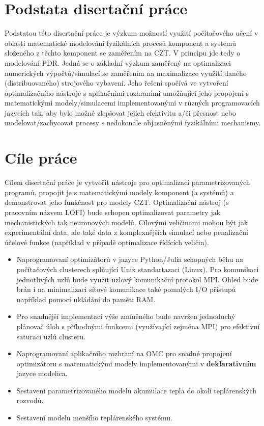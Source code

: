 \section{Podstata disertační práce}
\label{sec:Podstata}
Podstatou této disertační práce je výzkum možností využití počítačového učení
v oblasti matematické modelování fyzikálních procesů komponent a systémů
složeného z těchto komponent se zaměřením na CZT. V principu jde tedy o
modelování PDR. Jedná se o základní výzkum zaměřený na optimalizaci
numerických výpočtů/simulací se zaměřením na maximalizace využití daného
(distribuovaného) strojového vybavení. Jeho řešení spočívá ve vytvoření
optimalizačního nástroje s aplikačními rozhraními umožňující jeho propojení s
matematickými modely/simulacemi implementovanými v různých programovacích
jazycích tak, aby bylo možné zlepšovat jejich efektivitu a/či přesnost nebo
modelovat/zachycovat procesy s nedokonale objasněnými fyzikálními mechanismy.
\section{Cíle práce}
\label{sec:Aims}
Cílem disertační práce je vytvořit nástroje pro optimalizaci parametrizovaných
programů, propojit je s matematickými modely komponent (a systémů) a
demonstrovat jeho funkčnost pro modely CZT. Optimalizační nástroj (s pracovním
názvem LOFI) bude schopen optimalizovat parametry jak mechanistických tak
neuronových modelů. Cílovými veličinami mohou být jak experimentální data, ale
také data z komplexnějších simulací nebo penalizační účelové funkce (například
v případě optimalizace řídících veličin).
\begin{itemize}
  \item
    Naprogramovaní optimizátorů v jazyce Python/Julia schopných běhu na
    počítačových clusterech splňující Unix standartazaci (Linux). Pro
    komunikaci jednotlivých uzlů bude využit uzlový komunikační protokol MPI.
    Ohled bude brán i na minimalizaci síťové komunikace také pomalých I/O
    přístupů například pomocí ukládání do paměti RAM.
  \item
    Pro snadnější implementaci výše zmíněného bude navržen jednoduchý plánovač
    úloh s příhodnými funkcemi (využívající zejména MPI) pro efektivní saturaci
    uzlů clusteru.
  \item
    Naprogramovaní aplikačního rozhraní na OMC pro snadné propojení
    optimizátoru s matematickými modely implementovanými v
    \textbf{deklarativním} jazyce modelica.
  \item
    Sestavení parametrizovaného modelu akumulace tepla do okolí teplárenských
    rozvodů. 
  \item
    Sestavení modelu menšího teplárenského systému.
\end{itemize}
